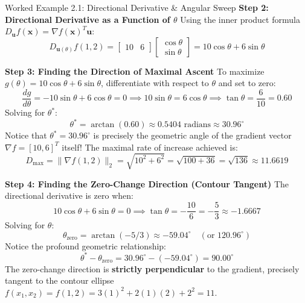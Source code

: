 \begin{examplebox}[breakable]{Worked Example 2.1: Directional Derivative \& Angular Sweep}
\textbf{Step 2: Directional Derivative as a Function of $\theta$}
Using the inner product formula $D_{\mathbf{u}} f(\mathbf{x}) = \nabla f(\mathbf{x})^T \mathbf{u}$:
\begin{equation*}
D_{\mathbf{u}(\theta)} f(1, 2) = \begin{bmatrix} 10 & 6 \end{bmatrix} \begin{bmatrix} \cos\theta \\ \sin\theta \end{bmatrix} = 10\cos\theta + 6\sin\theta
\end{equation*}

\textbf{Step 3: Finding the Direction of Maximal Ascent}
To maximize $g(\theta) = 10\cos\theta + 6\sin\theta$, differentiate with respect to $\theta$ and set to zero:
\begin{equation*}
\frac{dg}{d\theta} = -10\sin\theta + 6\cos\theta = 0 \implies 10\sin\theta = 6\cos\theta \implies \tan\theta = \frac{6}{10} = 0.60
\end{equation*}
Solving for $\theta^*$:
\begin{equation*}
\theta^* = \arctan(0.60) \approx 0.5404 \text{ radians} \approx \mathbf{30.96^\circ}
\end{equation*}
Notice that $\theta^* = 30.96^\circ$ is precisely the geometric angle of the gradient vector $\nabla f = [10, 6]^T$ itself!
The maximal rate of increase achieved is:
\begin{equation*}
D_{\max} = \|\nabla f(1, 2)\|_2 = \sqrt{10^2 + 6^2} = \sqrt{100 + 36} = \sqrt{136} \approx \mathbf{11.6619}
\end{equation*}

\textbf{Step 4: Finding the Zero-Change Direction (Contour Tangent)}
The directional derivative is zero when:
\begin{equation*}
10\cos\theta + 6\sin\theta = 0 \implies \tan\theta = -\frac{10}{6} = -\frac{5}{3} \approx -1.6667
\end{equation*}
Solving for $\theta$:
\begin{equation*}
\theta_{\text{zero}} = \arctan(-5/3) \approx -59.04^\circ \quad (\text{or } 120.96^\circ)
\end{equation*}
Notice the profound geometric relationship:
\begin{equation*}
\theta^* - \theta_{\text{zero}} = 30.96^\circ - (-59.04^\circ) = \mathbf{90.00^\circ}
\end{equation*}
The zero-change direction is \textbf{strictly perpendicular} to the gradient, precisely tangent to the contour ellipse $f(x_1, x_2) = f(1, 2) = 3(1)^2 + 2(1)(2) + 2^2 = 11$.
\end{examplebox}

